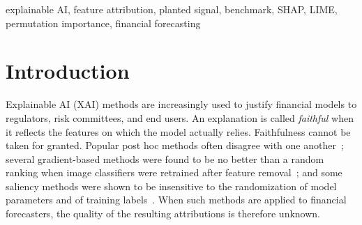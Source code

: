 \documentclass[conference]{IEEEtran}
\begin{document}
\begin{abstract}
Attributions produced by explainable AI (XAI) methods are often read as
evidence of what drives a financial forecast, yet they are rarely checked
against a known answer. In this paper, a planted-signal recovery benchmark is
constructed on real market data. Six synthetic features with known relations
to the target (a linear signal at two strengths, a sign-coded nonlinear
signal, pure noise, and an exact and a partial copy of a real feature) are
injected into a panel of \nTickers{} large-cap stocks, and
\nXaiMethodsCatalogued{} XAI methods are catalogued across \nModelsZoo{}
model architectures. Recovery, defined as ranking a planted signal above the
noise feature on held-out data, is treated as a necessary condition for a
faithful explanation and not as a sufficient one. All \nXaiNativeScored{}
methods that yield a feature-importance vector recovered the two strong
signals on every model tested. At the level of individual stocks, TreeSHAP,
KernelSHAP, and LIME recovered all three signals in every stock, whereas
permutation importance recovered the strong linear signal in
\pctSymPermutation\% of stocks and did not recover the weak one. The credit
assigned to duplicated features differed widely between methods, and two
concept-based scores could not be distinguished from those of random
directions. The pipeline, configuration, and results are publicly released.
\end{abstract}

\begin{IEEEkeywords}
explainable AI, feature attribution, planted signal, benchmark, SHAP, LIME,
permutation importance, financial forecasting
\end{IEEEkeywords}

\section{Introduction}
Explainable AI (XAI) methods are increasingly used to justify financial
models to regulators, risk committees, and end users. An explanation is
called \emph{faithful} when it reflects the features on which the model
actually relies. Faithfulness cannot be taken for granted. Popular post hoc
methods often disagree with one another~\cite{krishna2024disagreement};
several gradient-based methods were found to be no better than a random
ranking when image classifiers were retrained after feature
removal~\cite{hooker2019roar}; and some saliency methods were shown to be
insensitive to the randomization of model parameters and of training
labels~\cite{adebayo2018sanity}. When such methods are applied to financial
forecasters, the quality of the resulting attributions is therefore unknown.
\end{document}
